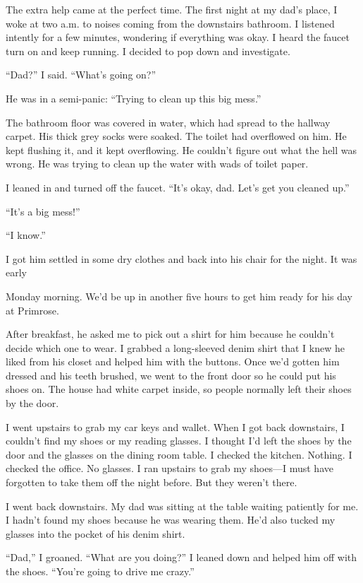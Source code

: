 \documentclass[12pt]{book}
\begin{document}
The extra help came at the perfect time. The first night at my dad's place, I woke at two a.m. to noises coming from the downstairs bathroom. I listened intently for a few minutes, wondering if everything was okay. I heard the faucet turn on and keep running. I decided to pop down and investigate.

``Dad?'' I said. ``What's going on?''

He was in a semi-panic: ``Trying to clean up this big mess.''

The bathroom floor was covered in water, which had spread to the hallway carpet. His thick grey socks were soaked. The toilet had overflowed on him. He kept flushing it, and it kept overflowing. He couldn't figure out what the hell was wrong. He was trying to clean up the water with wads of toilet paper.

I leaned in and turned off the faucet. ``It's okay, dad. Let's get you cleaned up.''

``It's a big mess!''

``I know.''

I got him settled in some dry clothes and back into his chair for the night. It was early

Monday morning. We'd be up in another five hours to get him ready for his day at Primrose.

After breakfast, he asked me to pick out a shirt for him because he couldn't decide which one to wear. I grabbed a long-sleeved denim shirt that I knew he liked from his closet and helped him with the buttons. Once we'd gotten him dressed and his teeth brushed, we went to the front door so he could put his shoes on. The house had white carpet inside, so people normally left their shoes by the door.

I went upstairs to grab my car keys and wallet. When I got back downstairs, I couldn't find my shoes or my reading glasses. I thought I'd left the shoes by the door and the glasses on the dining room table. I checked the kitchen. Nothing. I checked the office. No glasses. I ran upstairs to grab my shoes---I must have forgotten to take them off the night before. But they weren't there.

I went back downstairs. My dad was sitting at the table waiting patiently for me. I hadn't found my shoes because he was wearing them. He'd also tucked my glasses into the pocket of his denim shirt.

``Dad,'' I groaned. ``What are you doing?'' I leaned down and helped him off with the shoes. ``You're going to drive me crazy.''
\end{document}
